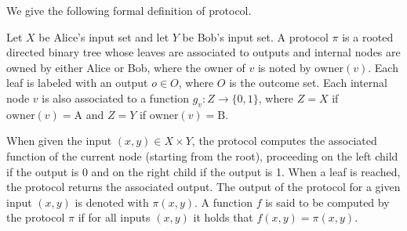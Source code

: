 We give the following formal definition of protocol. \cite{comm_compl_appl}

\begin{definition}
    Let $X$ be Alice's input set and let $Y$ be Bob's input set. A protocol $\pi$ is a rooted directed binary tree whose leaves are associated to outputs and internal nodes are owned by either Alice or Bob, where the owner of $v$ is noted by $\mathrm{owner}(v)$. Each leaf is labeled with an output $o \in O$, where $O$ is the outcome set. Each internal node $v$ is also associated to a function $g_v : Z \to \{0,1\}$, where $Z = X$ if $\mathrm{owner}(v) = \mathrm{A}$ and $Z = Y$ if $\mathrm{owner}(v) = \mathrm{B}$.
\end{definition}

When given the input $(x,y) \in X \times Y$, the protocol computes the associated function of the current node (starting from the root), proceeding on the left child if the output is 0 and on the right child if the output is 1. When a leaf is reached, the protocol returns the associated output. The output of the protocol for a given input $(x,y)$ is denoted with $\pi(x,y)$. A function $f$ is said to be computed by the protocol $\pi$ if for all inputs $(x,y)$ it holds that $f(x,y) = \pi(x,y)$.

\newpage

